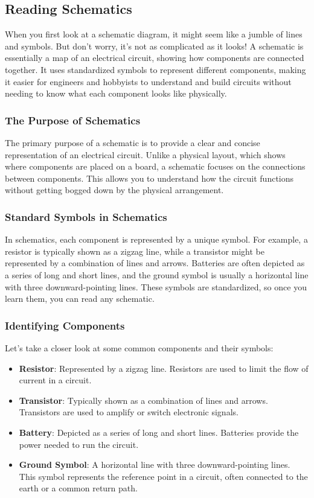 \subsection{Reading Schematics}
\label{subsec:schem-reading}

When you first look at a schematic diagram, it might seem like a jumble of lines and symbols. But don't worry, it's not as complicated as it looks! A schematic is essentially a map of an electrical circuit, showing how components are connected together. It uses standardized symbols to represent different components, making it easier for engineers and hobbyists to understand and build circuits without needing to know what each component looks like physically.

\subsubsection*{The Purpose of Schematics}
The primary purpose of a schematic is to provide a clear and concise representation of an electrical circuit. Unlike a physical layout, which shows where components are placed on a board, a schematic focuses on the connections between components. This allows you to understand how the circuit functions without getting bogged down by the physical arrangement.

\subsubsection*{Standard Symbols in Schematics}
In schematics, each component is represented by a unique symbol. For example, a resistor is typically shown as a zigzag line, while a transistor might be represented by a combination of lines and arrows. Batteries are often depicted as a series of long and short lines, and the ground symbol is usually a horizontal line with three downward-pointing lines. These symbols are standardized, so once you learn them, you can read any schematic.

\subsubsection*{Identifying Components}
Let's take a closer look at some common components and their symbols:

\begin{itemize}[noitemsep]    \item \textbf{Resistor}: Represented by a zigzag line. Resistors are used to limit the flow of current in a circuit.
    \item \textbf{Transistor}: Typically shown as a combination of lines and arrows. Transistors are used to amplify or switch electronic signals.
    \item \textbf{Battery}: Depicted as a series of long and short lines. Batteries provide the power needed to run the circuit.
    \item \textbf{Ground Symbol}: A horizontal line with three downward-pointing lines. This symbol represents the reference point in a circuit, often connected to the earth or a common return path.
\end{itemize}

